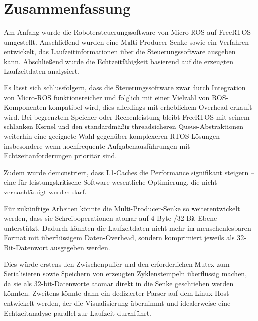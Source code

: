 \section{Zusammenfassung}

Am Anfang wurde die Robotersteuerungssoftware von Micro-ROS auf FreeRTOS
umgestellt. Anschließend wurden eine Multi-Producer-Senke sowie ein Verfahren
entwickelt, das Laufzeitinformationen über die Steuerungssoftware ausgeben kann.
Abschließend wurde die Echtzeitfähigkeit basierend auf die erzeugten
Laufzeitdaten analysiert.

Es lässt sich schlussfolgern, dass die Steuerungssoftware zwar durch Integration
von Micro-ROS funktionsreicher und folglich mit einer Vielzahl von
ROS-Komponenten kompatibel wird, dies allerdings mit erheblichem Overhead
erkauft wird. Bei begrenztem Speicher oder Rechenleistung bleibt FreeRTOS mit
seinem schlanken Kernel und den standardmäßig threadsicheren Queue-Abstraktionen
weiterhin eine geeignete Wahl gegenüber komplexeren RTOS-Lösungen --
insbesondere wenn hochfrequente Aufgabenausführungen mit Echtzeitanforderungen
prioritär sind.

Zudem wurde demonstriert, dass L1-Caches die Performance signifikant steigern --
eine für leistungskritische Software wesentliche Optimierung, die nicht
vernachlässigt werden darf.

Für zukünftige Arbeiten könnte die Multi-Producer-Senke so weiterentwickelt
werden, dass sie Schreiboperationen atomar auf 4-Byte-/32-Bit-Ebene unterstützt.
Dadurch könnten die Laufzeitdaten nicht mehr im menschenlesbaren Format mit
überflüssigem Daten-Overhead, sondern komprimiert jeweils als 32-Bit-Datenwort
ausgegeben werden.

Dies würde erstens den Zwischenpuffer und den erforderlichen Mutex zum
Serialisieren sowie Speichern von erzeugten Zyklenstempeln überflüssig machen,
da sie als 32-bit-Datenworte atomar direkt in die Senke geschrieben werden
könnten. Zweitens könnte dann ein dedizierter Parser auf dem Linux-Host
entwickelt werden, der die Visualisierung übernimmt und idealerweise eine
Echtzeitanalyse parallel zur Laufzeit durchführt.

